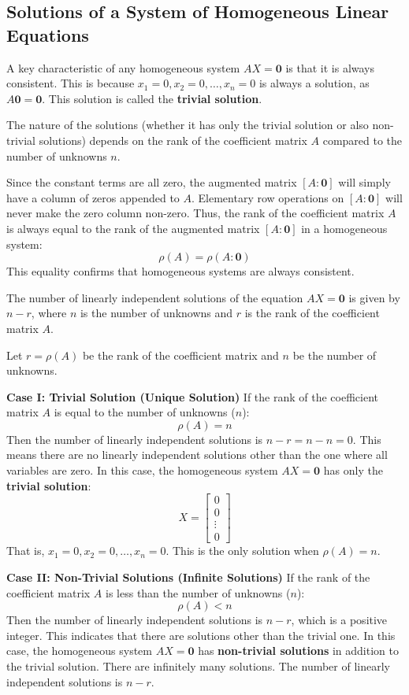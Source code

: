 \documentclass{article}
\begin{document}
\subsection{Solutions of a System of Homogeneous Linear Equations}

A key characteristic of any homogeneous system $AX=\mathbf{0}$ is that it is always consistent. This is because $x_1=0, x_2=0, \dots, x_n=0$ is always a solution, as $A\mathbf{0} = \mathbf{0}$. This solution is called the \textbf{trivial solution}.

The nature of the solutions (whether it has only the trivial solution or also non-trivial solutions) depends on the rank of the coefficient matrix $A$ compared to the number of unknowns $n$.

Since the constant terms are all zero, the augmented matrix $[A:\mathbf{0}]$ will simply have a column of zeros appended to $A$. Elementary row operations on $[A:\mathbf{0}]$ will never make the zero column non-zero. Thus, the rank of the coefficient matrix $A$ is always equal to the rank of the augmented matrix $[A:\mathbf{0}]$ in a homogeneous system:
\[ \rho(A) = \rho(A:\mathbf{0}) \]
This equality confirms that homogeneous systems are always consistent.

The number of linearly independent solutions of the equation $AX = \mathbf{0}$ is given by $n - r$, where $n$ is the number of unknowns and $r$ is the rank of the coefficient matrix $A$.

Let $r = \rho(A)$ be the rank of the coefficient matrix and $n$ be the number of unknowns.

\textbf{Case I: Trivial Solution (Unique Solution)}
If the rank of the coefficient matrix $A$ is equal to the number of unknowns ($n$):
\[ \rho(A) = n \]
Then the number of linearly independent solutions is $n - r = n - n = 0$. This means there are no linearly independent solutions other than the one where all variables are zero.
In this case, the homogeneous system $AX = \mathbf{0}$ has only the \textbf{trivial solution}:
\[ X = \begin{bmatrix} 0 \\ 0 \\ \vdots \\ 0 \end{bmatrix} \]
That is, $x_1 = 0, x_2 = 0, \dots, x_n = 0$. This is the only solution when $\rho(A) = n$.

\textbf{Case II: Non-Trivial Solutions (Infinite Solutions)}
If the rank of the coefficient matrix $A$ is less than the number of unknowns ($n$):
\[ \rho(A) < n \]
Then the number of linearly independent solutions is $n - r$, which is a positive integer. This indicates that there are solutions other than the trivial one.
In this case, the homogeneous system $AX = \mathbf{0}$ has \textbf{non-trivial solutions} in addition to the trivial solution. There are infinitely many solutions. The number of linearly independent solutions is $n - r$.
\end{document}
